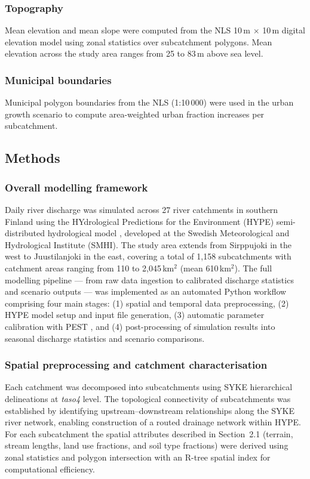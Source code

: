 \documentclass[draft]{agujournal2019}
\begin{document}
\subsubsection{Topography}
Mean elevation and mean slope were computed from the NLS 10\,m $\times$ 10\,m digital elevation model using zonal statistics over subcatchment polygons. Mean elevation across the study area ranges from 25 to 83\,m above sea level.

\subsubsection{Municipal boundaries}
Municipal polygon boundaries from the NLS (1:10\,000) were used in the urban growth scenario to compute area-weighted urban fraction increases per subcatchment.

\subsection{Methods}

\subsubsection{Overall modelling framework}
Daily river discharge was simulated across 27 river catchments in southern Finland using the HYdrological Predictions for the Environment (HYPE) semi-distributed hydrological model \cite{Lindstrom2010}, developed at the Swedish Meteorological and Hydrological Institute (SMHI). The study area extends from Sirppujoki in the west to Juustilanjoki in the east, covering a total of 1,158 subcatchments with catchment areas ranging from 110 to 2,045\,km$^2$ (mean 610\,km$^2$). The full modelling pipeline — from raw data ingestion to calibrated discharge statistics and scenario outputs — was implemented as an automated Python workflow comprising four main stages: (1) spatial and temporal data preprocessing, (2) HYPE model setup and input file generation, (3) automatic parameter calibration with PEST \cite{Doherty2015}, and (4) post-processing of simulation results into seasonal discharge statistics and scenario comparisons.

\subsubsection{Spatial preprocessing and catchment characterisation}
Each catchment was decomposed into subcatchments using SYKE hierarchical delineations at \textit{taso4} level. The topological connectivity of subcatchments was established by identifying upstream–downstream relationships along the SYKE river network, enabling construction of a routed drainage network within HYPE. For each subcatchment the spatial attributes described in Section~2.1 (terrain, stream lengths, land use fractions, and soil type fractions) were derived using zonal statistics and polygon intersection with an R-tree spatial index for computational efficiency.
\end{document}
